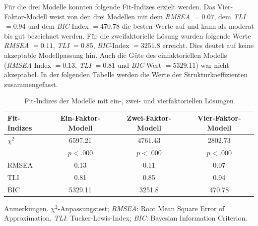 \documentclass[12pt,a4paper]{article}
\begin{document}
	Für die drei Modelle konnten folgende Fit-Indizes erzielt werden. Das Vier-Faktor-Modell weist von den drei Modellen mit dem \textit{RMSEA} $= 0.07$, dem \textit{TLI} $= 0.94$ und dem \textit{BIC}-Index $= 470.78$ die besten Werte auf und kann als moderat bis gut bezeichnet werden. Für die zweifaktorielle Lösung wurden folgende Werte \textit{RMSEA} $= 0.11$, \textit{TLI} $= 0.85$, \textit{BIC}-Index $= 3251.8$ erreicht. Dies deutet auf keine akzeptable Modellpassung hin. Auch die Güte des einfaktoriellen Modells (\textit{RMSEA}-Index $= 0.13$, \textit{TLI} $= 0.81$ und \textit{BIC}-Wert $= 5329.11$) war nicht akzeptabel. In der folgenden Tabelle werden die Werte der Strukturkoeffizienten zusammengefasst.
\begin{table}
\caption {Fit-Indizes der Modelle mit ein-, zwei- und vierfaktoriellen Lösungen}
\label{tab_fit}
    \begin{tabular}{l|ccc}
Fit-Indizes & Ein-Faktor-Modell & Zwei-Faktor-Modell & Vier-Faktor-Modell \\ 
\hline 
 
$\chi^2$ &
             6597.21 &
     

   $4761.43$ &
    
    $2802.73$\\
    & $p < .000$ & $p < .000$ &
     $p < .000$ \\
RMSEA &
0.13 &
0.11 &
0.07\\
TLI &
0.81 &
0.85 &
0.94\\
BIC &
     5329.11 &
    3251.8 &
    470.78\\
    \hline
    \end{tabular}

    \end{table}
Anmerkungen. $\chi^2$-Anpassungstest; \textit{RMSEA}: Root Mean Square Error of Approximation, \textit{TLI}: Tucker-Lewis-Index; \textit{BIC}: Bayesian Information Criterion.
\end{document}
